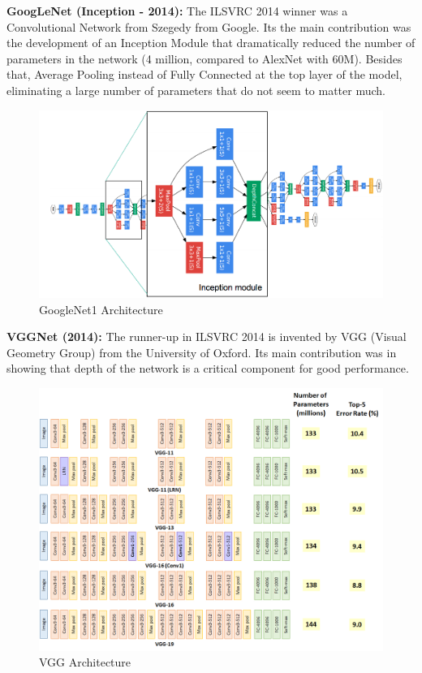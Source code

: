 \vspace{-1cm}
\textbf{GoogLeNet (Inception - 2014):} The ILSVRC 2014 winner was a Convolutional Network from Szegedy from Google. Its the main contribution was the development of an Inception Module that dramatically reduced the number of parameters in the network (4 million, compared to AlexNet with 60M). Besides that, Average Pooling instead of Fully Connected at the top layer of the model, eliminating a large number of parameters that do not seem to matter much.
\begin{center}
  \begin{figure}[H]
  \centering
  \includegraphics[width=1\columnwidth]{images/chap2/GoogleNet1.png}
  \caption{GoogleNet1 Architecture}
  \label{chap2:WSP}
  \end{figure}
\end{center}
\vspace{-1cm}
\textbf{VGGNet (2014):} The runner-up in ILSVRC 2014 is invented by VGG (Visual Geometry Group) from the University of Oxford. Its main contribution was in showing that depth of the network is a critical component for good performance. 
\begin{center}
  \begin{figure}[H]
  \centering
  \includegraphics[width=1\columnwidth]{images/chap2/VGG_arch.png}
  \caption{VGG Architecture}
  \label{chap2:WSP}
  \end{figure}
\end{center}
